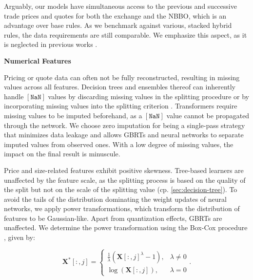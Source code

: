 Arguably, our models have simultaneous access to the previous and successive trade prices and quotes for both the exchange and the \gls{NBBO}, which is an advantage over base rules. As we benchmark against various, stacked hybrid rules, the data requirements are still comparable. We emphasize this aspect, as it is neglected in previous works \autocites[][485]{blazejewskiLocalNonParametricModel2005}[][48]{ronenMachineLearningTrade2022}[][398]{rosenthalModelingTradeDirection2012}.

\textbf{Numerical Features}

Pricing or quote data can often not be fully reconstructed, resulting in missing values across all features. Decision trees and ensembles thereof can inherently handle $\mathtt{[NaN]}$ values by discarding missing values in the splitting procedure \autocite[][150--152]{breimanClassificationRegressionTrees2017} or by incorporating missing values into the splitting criterion \autocite[][951]{twalaGoodMethodsCoping2008}. Transformers require missing values to be imputed beforehand, as a $\mathtt{[NaN]}$ value cannot be propagated through the network. We choose zero imputation for being a single-pass strategy that minimizes data leakage and allows \glspl{GBRT} and neural networks to separate imputed values from observed ones. With a low degree of missing values, the impact on the final result is minuscule.

Price and size-related features exhibit positive skewness. Tree-based learners are unaffected by the feature scale, as the splitting process is based on the quality of the split but not on the scale of the splitting value (cp. \cref{sec:decision-tree}). To avoid the tails of the distribution dominating the weight updates of neural networks, we apply power transformations, which transform the distribution of features to be Gaussian-like. Apart from quantization effects, \glspl{GBRT} are unaffected. We determine the power transformation using the Box-Cox procedure \autocite[][214]{boxAnalysisTransformations2022}, given by:

\begin{equation}
    \mathbf{X}^{*}\left[:,j\right]= \begin{cases}\frac{1}{\lambda}(\mathbf{X}\left[:,j\right]^\lambda-1), & \lambda \neq 0 \\ \log (\mathbf{X}\left[:,j\right]),& \lambda=0\end{cases}.
    \label{eq:box-cox-test}
\end{equation}

